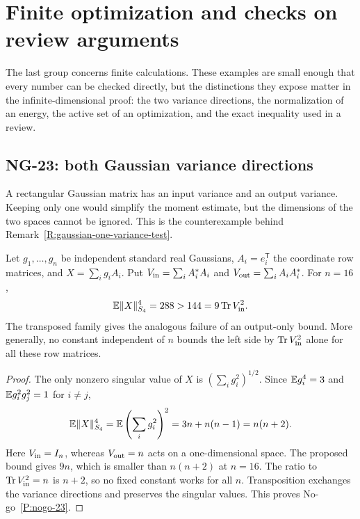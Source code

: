 \section{Finite optimization and checks on review arguments}
\label{S:nogo-optimization}

The last group concerns finite calculations. These examples are small enough
that every number can be checked directly, but the distinctions they expose
matter in the infinite-dimensional proof: the two variance directions, the
normalization of an energy, the active set of an optimization, and the exact
inequality used in a review.

\subsection{NG-23: both Gaussian variance directions}
\label{S:nogo-23}

A rectangular Gaussian matrix has an input variance and an output variance.
Keeping only one would simplify the moment estimate, but the dimensions of
the two spaces cannot be ignored. This is the counterexample behind
Remark~\ref{R:gaussian-one-variance-test}.

\setcounter{nogo}{22}
\begin{nogo}\label{P:nogo-23}
  Let $g_1,\ldots,g_n$ be independent standard real Gaussians,
  $A_i=e_i^{\mathsf T}$ the coordinate row matrices, and
  $X=\sum_i g_iA_i$. Put $V_{\rm in}=\sum_iA_i^*A_i$ and
  $V_{\rm out}=\sum_iA_iA_i^*$. For $n=16$,
  \[
    \mathbb{E}\|X\|_{S_4}^4=288>144=9\operatorname{Tr}V_{\rm in}^2.
  \]
  The transposed family gives the analogous failure of an output-only bound.
  More generally, no constant independent of $n$ bounds the left side by
  $\operatorname{Tr}V_{\rm in}^2$ alone for all these row matrices.
\end{nogo}

\begin{proof}
  The only nonzero singular value of $X$ is
  $(\sum_i g_i^2)^{1/2}$. Since $\mathbb{E} g_i^4=3$ and
  $\mathbb{E} g_i^2g_j^2=1$ for $i\ne j$,
  \[
    \mathbb{E}\|X\|_{S_4}^4
    =\mathbb{E}\left(\sum_i g_i^2\right)^2
    =3n+n(n-1)=n(n+2).
  \]
  Here $V_{\rm in}=I_n$, whereas $V_{\rm out}=n$ acts on a
  one-dimensional space. The proposed bound gives $9n$, which is smaller
  than $n(n+2)$ at $n=16$. The ratio to $\operatorname{Tr}V_{\rm in}^2=n$
  is $n+2$, so no fixed constant works for all $n$. Transposition exchanges
  the variance directions and preserves the singular values. This proves
  No-go~\ref{P:nogo-23}.
\end{proof}

